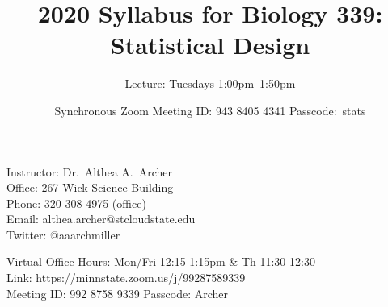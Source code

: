 \documentclass{tufte-handout}
\title{2020 Syllabus for Biology 339: Statistical Design}										%
\author{Lecture: Tuesdays 1:00pm--1:50pm }										%
\date{Synchronous Zoom Meeting ID: 943 8405 4341
Passcode:~stats}
\begin{document}
\maketitle

Instructor: Dr.~Althea A.~Archer\\
Office: 267 Wick Science Building\\
Phone: 320-308-4975 (office) \\ %
Email: althea.archer@stcloudstate.edu\\
Twitter: @aaarchmiller

Virtual Office Hours: Mon/Fri 12:15-1:15pm \& Th 11:30-12:30\\
Link: https://minnstate.zoom.us/j/99287589339\\
Meeting ID: 992 8758 9339 Passcode: Archer
\end{document}
